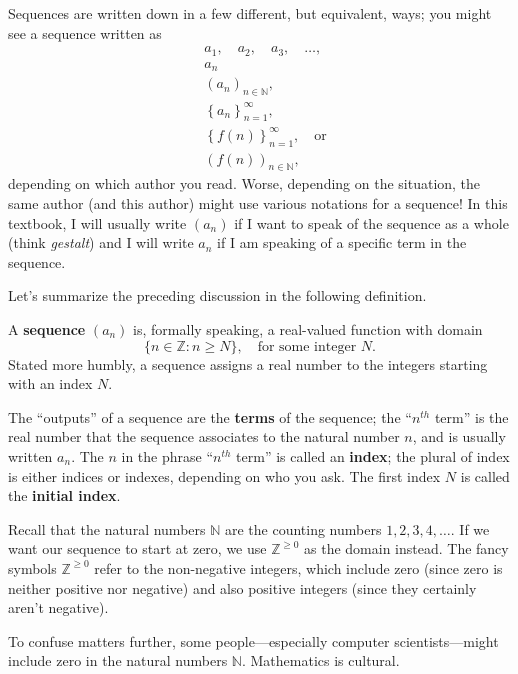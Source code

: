 \documentclass{ximera}
\newcommand{\defnword}[1]{\textbf{#1}}
\newcommand{\Z}{\mathbb{Z}}
\newcommand{\N}{\mathbb{N}}
\renewcommand{\index}[1]{}
\begin{document}
Sequences are written down in a few different, but equivalent,
ways; you might see a sequence written as
\begin{align*}
  & a_1,\quad a_2, \quad a_3, \quad\ldots, \\
  & a_n \\
  & \left(a_n\right)_{n \in \N}, \\
  & \left\{a_n\right\}_{n=1}^\infty, \\
  & \left\{f(n)\right\}_{n=1}^\infty, \quad \mbox{or} \\
  & \left(f(n)\right)_{n \in \N},
\end{align*}
depending on which author you read.  Worse, depending on the
situation, the same author (and this author) might use various
notations for a sequence!  In this textbook, I will usually write
$(a_n)$ if I want to speak of the sequence as a whole (think
\textit{gestalt}) and I will write $a_n$ if I am speaking of a
specific term in the sequence.

Let's summarize the preceding discussion in the following definition.
\begin{definition}\index{sequence} A \defnword{sequence}
  $(a_n)$ is, formally speaking, a real-valued function with domain
  \[
  \{ n \in \Z : n \geq N \},\quad \mbox{for some integer $N$.}
  \]
  Stated more humbly, a sequence assigns a real number to the
  integers starting with an index $N$.

  The ``outputs'' of a sequence are the \defnword{terms} of the
  sequence; the ``$n^{th}$ term'' is the real number that the
  sequence associates to the natural number $n$, and is usually
  written $a_n$. \index{sequence!term} The $n$ in the phrase
  ``$n^{th}$ term'' is called an
  \defnword{index}\index{sequence!index}; the plural of index is
  either indices or indexes, depending on who you ask.  The first
  index $N$ is called the \defnword{initial
    index}\index{sequence!index!initial}.
\end{definition} 

\begin{observation}
  Recall that the natural numbers $\N$ are the counting numbers $1, 2,
  3, 4, \ldots$.  If we want our sequence to start at zero, we use
  $\Z^{\ge 0}$ as the domain instead.  The fancy symbols $\Z^{\ge 0}$
  refer to the non-negative integers, which include zero (since zero
  is neither positive nor negative) and also positive integers (since
  they certainly aren't negative).

  To confuse matters further, some people---especially computer
  scientists---might include zero in the natural numbers $\N$.
  Mathematics is cultural.
\end{observation}
\end{document}
